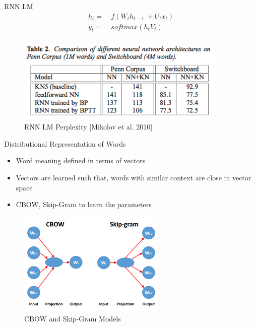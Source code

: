 \documentclass{beamer}
\begin{document}

\begin{frame}{RNN LM}
	\begin{align*}
		h_{t} =&\ f(W_{t}h_{t-1}\ + U_{t}x_{t}) \\
		y_{t} =&\ softmax(h_{t}V_{t}) \\
	\end{align*}

	\begin{figure}
	   \includegraphics[width=10cm, height=4cm]{figs/ptb_rnnlm_mikolov_2011.png}
	   \caption{RNN LM Perplexity [Mikolov et al. 2010]}
	\end{figure}
\end{frame}


\begin{frame}{Distributional Representation of Words}
	\begin{itemize}
		\item Word meaning defined in terms of vectors
		\item Vectors are learned such that, words with similar context are close in vector space
		\item CBOW, Skip-Gram to learn the parameters
	\end{itemize}


	\begin{figure}
	   \includegraphics[width=7cm, height=5cm]{figs/cbow_and_skipgram.png}
	   \caption{CBOW and Skip-Gram Models}
	\end{figure}
\end{frame}
\end{document}
